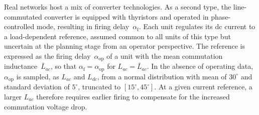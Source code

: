 

Real networks host a mix of converter technologies. As a second type, the line-commutated converter is equipped with thyristors and operated in phase-controlled mode, resulting in firing delay~$\alpha_{\text{f}}$. Each unit regulates its dc current to a load-dependent reference, assumed common to all units of this type but uncertain at the planning stage from an operator perspective. The reference is expressed as the firing delay~$\alpha_{\text{op}}$ of a unit with the mean commutation inductance~$\bar{L}_{ac}$, so that $\alpha_{\text{f}} = \alpha_{\text{op}}$ for $L_{ac} = \bar{L}_{ac}$. In the absence of operating data, $\alpha_{\text{op}}$ is sampled, as $L_{ac}$ and $L_{dc}$, from a normal distribution with mean of $30^{\circ}$ and standard deviation of $5^{\circ}$, truncated to $[15^{\circ}, 45^{\circ}]$.
At a given current reference, a larger $L_{ac}$ therefore requires earlier firing to compensate for the increased commutation voltage drop.

